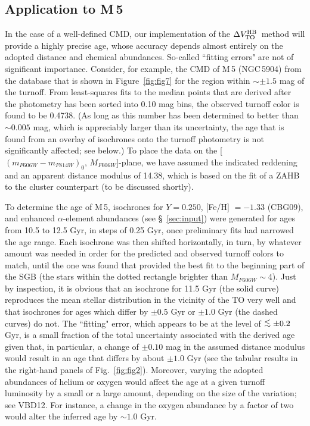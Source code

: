 \documentclass[12pt,preprint]{aastex}
\newcommand\delv{\Delta V^{\rm HB}_{\rm TO}}
\newcommand\lta{\mathrel{\hbox{\raise 0.6 ex \hbox{$<$}\kern
                   -1.8 ex\lower .5 ex\hbox{$\sim$}}}}
\begin{document}
\subsection{Application to M$\,$5}
\label{subsec:m5}

In the case of a well-defined CMD, our implementation of the $\delv$\ method 
will provide a highly precise age, whose accuracy depends almost entirely on
the adopted distance and chemical abundances.  So-called 
``fitting errors" are not of significant importance.  Consider, for example,
the CMD of M$\,$5 (NGC$\,$5904) from the \citet{sbc07} database that is shown
in Figure~\ref{fig:fig7} for the region within $\sim \pm1.5$ mag of the
turnoff.  From least-squares fits to the median points that are derived after
the photometry has been sorted into 0.10 mag bins, the observed turnoff color
is found to be 0.4738.  (As long as this number has been determined to better
than $\sim 0.005$ mag, which is appreciably larger than its uncertainty, the age
that is found from an overlay of isochrones onto the turnoff photometry is not
significantly affected; see below.)  To place the data on the [$(m_{F606W} -
m_{F814W})_0,\,M_{F606W}$]-plane, we have assumed the indicated reddening and
an apparent distance modulus of 14.38, which is based on the fit of a ZAHB to
the cluster counterpart (to be discussed shortly).

To determine the age of M$\,$5, isochrones for $Y = 0.250$, [Fe/H] $= -1.33$
(CBG09), and enhanced $\alpha$-element abundances (see \S~\ref{sec:input}) were
generated for ages from 10.5 to 12.5 Gyr, in steps of 0.25 Gyr, once preliminary
fits had narrowed the age range.  Each isochrone was then shifted horizontally,
in turn, by whatever amount was needed in order for the predicted and observed
turnoff colors to match, until the one was found that provided the best fit to
the beginning part of the SGB (the stars within the dotted rectangle brighter
than $M_{F606W} \sim 4$).  Just by inspection, it is obvious that an isochrone
for 11.5 Gyr (the solid curve) reproduces the mean stellar distribution in the
vicinity of the TO very well and that isochrones for ages which differ by $\pm
0.5$ Gyr or $\pm 1.0$ Gyr (the dashed curves) do not.  The ``fitting" error,
which appears to be at the level of $\lta \pm 0.2$ Gyr, is a small fraction of
the total uncertainty associated with the derived age given that, in particular,
a change of $\pm 0.10$ mag in the assumed distance modulus would result in an
age that differs by about $\pm 1.0$ Gyr (see the tabular results in the
right-hand panels of Fig.~\ref{fig:fig2}).  Moreover, varying the adopted
abundances of helium or oxygen would affect the age at a given turnoff
luminosity by a small or a large amount, depending on the size of the variation;
see VBD12.  For instance, a change in the oxygen abundance by a factor of two
would alter the inferred age by $\sim 1.0$ Gyr.
\end{document}
